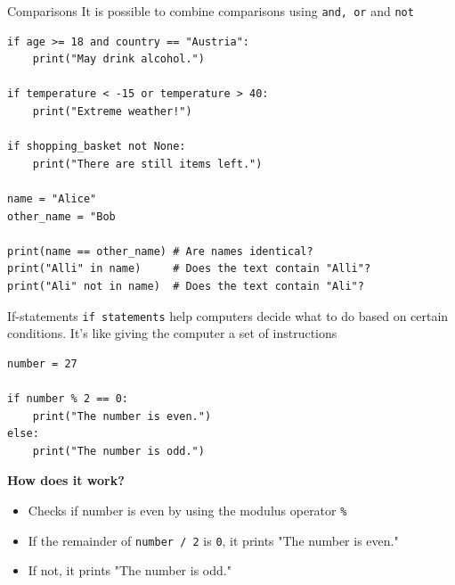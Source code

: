 \documentclass[
	11pt, 
]{beamer}
\begin{document}

\begin{frame}[fragile]{Comparisons}
It is possible to combine comparisons using \texttt{and, or} and \texttt{not}

\begin{verbatim}
if age >= 18 and country == "Austria":
    print("May drink alcohol.")

if temperature < -15 or temperature > 40:
    print("Extreme weather!")

if shopping_basket not None:
    print("There are still items left.")

name = "Alice"
other_name = "Bob

print(name == other_name) # Are names identical?
print("Alli" in name)     # Does the text contain "Alli"?
print("Ali" not in name)  # Does the text contain "Ali"?
\end{verbatim}

\end{frame}


\begin{frame}[fragile]{If-statements}
\texttt{if statements} help computers decide what to do based on certain conditions. It's like giving the computer a set of instructions

\begin{verbatim}
number = 27 

if number % 2 == 0:
    print("The number is even.")
else:
    print("The number is odd.")

\end{verbatim}

\begin{exampleblock}{\textbf{How does it work?}}
\begin{itemize}

    \item Checks if number is even by using the modulus operator \texttt{\%}
    \item If the remainder of \texttt{number / 2} is \texttt{0}, it prints "The number is even."
    \item If not, it prints "The number is odd."
\end{itemize}
\end{exampleblock}

\end{frame}
\end{document}
